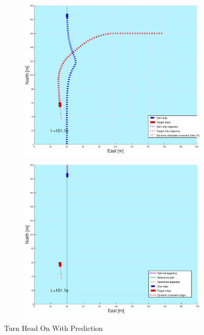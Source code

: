 \begin{figure}[ht]
\begin{subfigure}[b]{0.499\textwidth}
    \end{subfigure}
    \hfill
    \\
    \begin{subfigure}[b]{0.49\textwidth}
        \centering
        \includegraphics[width=\textwidth]{Images/Figures/sving_HO/_Simple_0fig1_time=101}
    \end{subfigure}
    \hfill
    \begin{subfigure}[b]{0.499\textwidth}
        \centering
        \includegraphics[width=\textwidth]{Images/Figures/sving_HO/_Simple_0fig999_time=101}
    \end{subfigure}
    \hfill
    \caption{Turn Head On With Prediction}
\end{figure}

